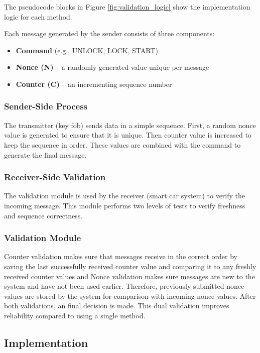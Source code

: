 \documentclass[a4paper,man,12pt]{article}
\begin{document}
The pseudocode blocks in Figure \ref{fig:validation_logic} show the 
implementation logic for each method.

Each message generated by the sender consists of three components:

\begin{itemize}
  \item \textbf{Command} (e.g., UNLOCK, LOCK, START)
  \item \textbf{Nonce (N)} -- a randomly generated value unique per message
  \item \textbf{Counter (C)} -- an incrementing sequence number
\end{itemize}

\subsubsection{Sender-Side Process}

The transmitter (key fob) sends data in a simple sequence. First, a random nonce value is generated to ensure that it is unique. Then counter value is increased to keep the sequence in order. These values are combined with the command to generate the final message.

\subsubsection{Receiver-Side Validation}
The validation module is used by the receiver (smart car system) to verify the incoming message. This module performs two levels of tests to verify freshness and sequence correctness.

\subsubsection{Validation Module}

Counter validation makes sure that messages receive in the correct order by saving the last successfully received counter value and comparing it to any freshly received counter values and Nonce validation makes sure messages are new to the system and have not been used earlier. Therefore, previously submitted nonce values are stored by the system for comparison with incoming nonce values. After both validations, an final decision is made. This dual validation improves reliability compared to using a single method.

\subsection{Implementation}
\end{document}
